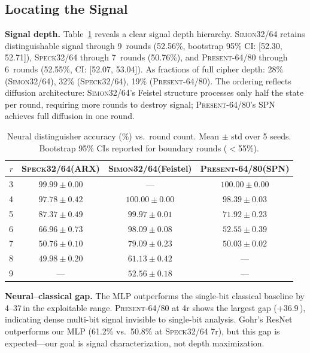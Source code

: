 \documentclass[runningheads]{llncs}
\newcommand{\speck}{\textsc{Speck32/64}\xspace}
\newcommand{\simon}{\textsc{Simon32/64}\xspace}
\newcommand{\present}{\textsc{Present-64/80}\xspace}
\newcommand{\pp}{\,\text{pp}}  %
\begin{document}
\subsection{Locating the Signal}
\label{sec:exp-representation}

\textbf{Signal depth.}
Table~\ref{tab:baseline} reveals a clear signal depth hierarchy.
\simon retains distinguishable signal through 9~rounds (52.56\%, bootstrap 95\% CI: [52.30, 52.71]), \speck through 7~rounds (50.76\%), and \present through 6~rounds (52.55\%, CI: [52.07, 53.04]).
As fractions of full cipher depth: 28\% (\simon), 32\% (\speck), 19\% (\present).
The ordering reflects diffusion architecture: \simon's Feistel structure processes only half the state per round, requiring more rounds to destroy signal; \present's SPN achieves full diffusion in one round.

\begin{table}[t]
\centering
\caption{Neural distinguisher accuracy (\%) vs.\ round count.
         Mean $\pm$ std over 5 seeds.
         Bootstrap 95\% CIs reported for boundary rounds ($<$55\%).}\label{tab:baseline}
\begin{tabular}{@{}rccc@{}}
\toprule
$r$ & \textbf{\speck (ARX)} & \textbf{\simon (Feistel)} & \textbf{\present (SPN)} \\
\midrule
3  & $99.99 \pm 0.00$  & ---                & $100.00 \pm 0.00$ \\
4  & $97.78 \pm 0.42$  & $100.00 \pm 0.00$  & $98.39 \pm 0.03$ \\
5  & $87.37 \pm 0.49$  & $99.97 \pm 0.01$   & $71.92 \pm 0.23$ \\
6  & $66.96 \pm 0.73$  & $98.09 \pm 0.08$   & $52.55 \pm 0.39$ \\
7  & $50.76 \pm 0.10$  & $79.09 \pm 0.23$   & $50.03 \pm 0.02$ \\
8  & $49.98 \pm 0.20$  & $61.13 \pm 0.42$   & --- \\
9  & ---               & $52.56 \pm 0.18$   & --- \\
\bottomrule
\end{tabular}
\end{table}

\textbf{Neural--classical gap.}
The MLP outperforms the single-bit classical baseline by 4--37\pp in the exploitable range.
\present at 4r shows the largest gap (+36.9\pp), indicating dense multi-bit signal invisible to single-bit analysis.
Gohr's ResNet outperforms our MLP (61.2\% vs.\ 50.8\% at \speck 7r), but this gap is expected---our goal is signal characterization, not depth maximization.
\end{document}
